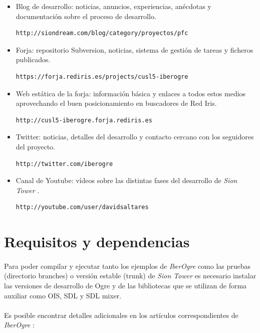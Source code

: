 \documentclass[16pt,spanish]{article}
\def \juego{\emph {Sion Tower} }
\def \wiki{\emph{IberOgre} }
\begin{document}
\begin{itemize}
    \item Blog de desarrollo: noticias, anuncios, experiencias, anécdotas y
    documentación sobre el proceso de desarrollo.
    \begin{verbatim}http://siondream.com/blog/category/proyectos/pfc\end{verbatim}
    \item Forja: repositorio Subversion, noticias, sistema de gestión de
    tareas y ficheros publicados.
    \begin{verbatim}https://forja.rediris.es/projects/cusl5-iberogre\end{verbatim}
    \item Web estática de la forja: información básica y enlaces a todos estos
    medios aprovechando el buen posicionamiento en buscadores de Red Iris.
    \begin{verbatim}http://cusl5-iberogre.forja.rediris.es\end{verbatim}
    \item Twitter: noticias, detalles del desarrollo y contacto cercano
    con los seguidores del proyecto.
    \begin{verbatim}http://twitter.com/iberogre\end{verbatim}
    \item Canal de Youtube: vídeos sobre las distintas fases del desarrollo
    de \juego.
    \begin{verbatim}http://youtube.com/user/davidsaltares\end{verbatim}
\end{itemize}

\section{Requisitos y dependencias}

\paragraph{}
Para poder compilar y ejecutar tanto los ejemplos de \wiki como las pruebas
(directorio branches) o versión estable (trunk) de \juego es necesario
instalar las versiones de desarrollo de Ogre y de las bibliotecas que se utilizan
de forma auxiliar como OIS, SDL y SDL mixer.

\paragraph{}
Es posible encontrar detalles adicionales en los artículos correspondientes
de \wiki:
\end{document}
